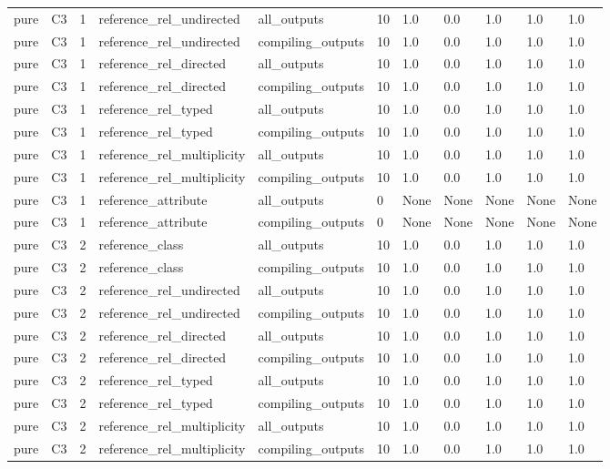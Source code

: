 \begin{tabular}{lllllllllll}
pure & C3 & 1 & reference\_rel\_undirected & all\_outputs & 10 & 1.0 & 0.0 & 1.0 & 1.0 & 1.0 \\
pure & C3 & 1 & reference\_rel\_undirected & compiling\_outputs & 10 & 1.0 & 0.0 & 1.0 & 1.0 & 1.0 \\
pure & C3 & 1 & reference\_rel\_directed & all\_outputs & 10 & 1.0 & 0.0 & 1.0 & 1.0 & 1.0 \\
pure & C3 & 1 & reference\_rel\_directed & compiling\_outputs & 10 & 1.0 & 0.0 & 1.0 & 1.0 & 1.0 \\
pure & C3 & 1 & reference\_rel\_typed & all\_outputs & 10 & 1.0 & 0.0 & 1.0 & 1.0 & 1.0 \\
pure & C3 & 1 & reference\_rel\_typed & compiling\_outputs & 10 & 1.0 & 0.0 & 1.0 & 1.0 & 1.0 \\
pure & C3 & 1 & reference\_rel\_multiplicity & all\_outputs & 10 & 1.0 & 0.0 & 1.0 & 1.0 & 1.0 \\
pure & C3 & 1 & reference\_rel\_multiplicity & compiling\_outputs & 10 & 1.0 & 0.0 & 1.0 & 1.0 & 1.0 \\
pure & C3 & 1 & reference\_attribute & all\_outputs & 0 & None & None & None & None & None \\
pure & C3 & 1 & reference\_attribute & compiling\_outputs & 0 & None & None & None & None & None \\
pure & C3 & 2 & reference\_class & all\_outputs & 10 & 1.0 & 0.0 & 1.0 & 1.0 & 1.0 \\
pure & C3 & 2 & reference\_class & compiling\_outputs & 10 & 1.0 & 0.0 & 1.0 & 1.0 & 1.0 \\
pure & C3 & 2 & reference\_rel\_undirected & all\_outputs & 10 & 1.0 & 0.0 & 1.0 & 1.0 & 1.0 \\
pure & C3 & 2 & reference\_rel\_undirected & compiling\_outputs & 10 & 1.0 & 0.0 & 1.0 & 1.0 & 1.0 \\
pure & C3 & 2 & reference\_rel\_directed & all\_outputs & 10 & 1.0 & 0.0 & 1.0 & 1.0 & 1.0 \\
pure & C3 & 2 & reference\_rel\_directed & compiling\_outputs & 10 & 1.0 & 0.0 & 1.0 & 1.0 & 1.0 \\
pure & C3 & 2 & reference\_rel\_typed & all\_outputs & 10 & 1.0 & 0.0 & 1.0 & 1.0 & 1.0 \\
pure & C3 & 2 & reference\_rel\_typed & compiling\_outputs & 10 & 1.0 & 0.0 & 1.0 & 1.0 & 1.0 \\
pure & C3 & 2 & reference\_rel\_multiplicity & all\_outputs & 10 & 1.0 & 0.0 & 1.0 & 1.0 & 1.0 \\
pure & C3 & 2 & reference\_rel\_multiplicity & compiling\_outputs & 10 & 1.0 & 0.0 & 1.0 & 1.0 & 1.0 \\

\end{tabular}
